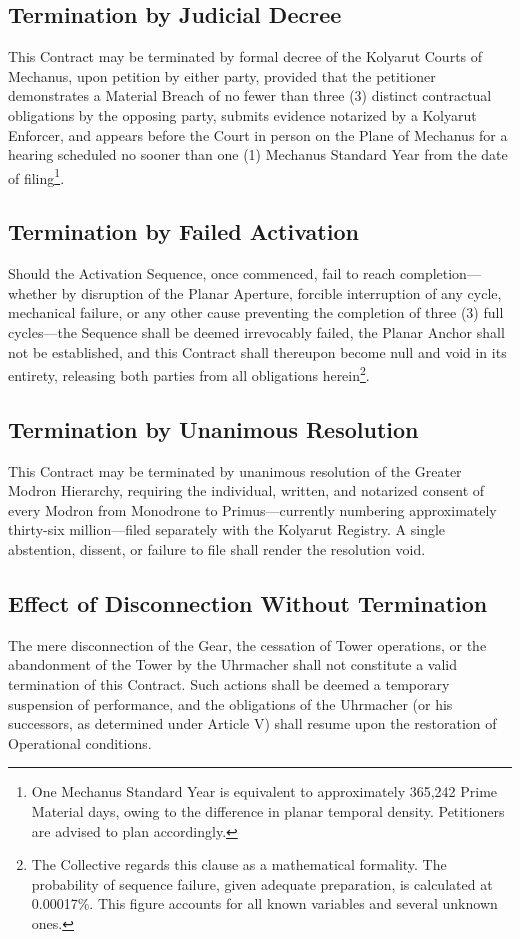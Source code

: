 \documentclass[12pt]{article}
\begin{document}
\subsection{Termination by Judicial Decree}
This Contract may be terminated by formal decree of the Kolyarut
Courts of Mechanus, upon petition by either party, provided that the
petitioner demonstrates a Material Breach of no fewer than three (3)
distinct contractual obligations by the opposing party, submits
evidence notarized by a Kolyarut Enforcer, and appears before the
Court in person on the Plane of Mechanus for a hearing scheduled no
sooner than one (1) Mechanus Standard Year from the date of
filing\footnote{One Mechanus Standard Year is equivalent to
approximately 365,242 Prime Material days, owing to the difference
in planar temporal density. Petitioners are advised to plan
accordingly.}.

\subsection{Termination by Failed Activation}
Should the Activation Sequence, once commenced, fail to reach
completion---whether by disruption of the Planar Aperture, forcible
interruption of any cycle, mechanical failure, or any other cause
preventing the completion of three (3)
full cycles---the Sequence shall be deemed irrevocably failed,
the Planar Anchor shall not be established, and this Contract shall
thereupon become null and void in its entirety, releasing
both parties from all obligations herein\footnote{The Collective
regards this clause as a mathematical formality. The probability of
sequence failure, given adequate preparation, is calculated at
0.00017\%. This figure accounts for all known variables and
several unknown ones.}.

\subsection{Termination by Unanimous Resolution}
This Contract may be terminated by unanimous resolution of the
Greater Modron Hierarchy, requiring the individual, written, and
notarized consent of every Modron from Monodrone to Primus---currently
numbering approximately thirty-six million---filed separately with the
Kolyarut Registry. A single abstention, dissent, or failure to file
shall render the resolution void.

\subsection{Effect of Disconnection Without Termination}
The mere disconnection of the Gear, the cessation of Tower operations,
or the abandonment of the Tower by the Uhrmacher shall not
constitute a valid termination of this Contract. Such actions shall be
deemed a temporary suspension of performance, and the obligations of
the Uhrmacher (or his successors, as determined under Article V)
shall resume upon the restoration of Operational conditions.
\end{document}
